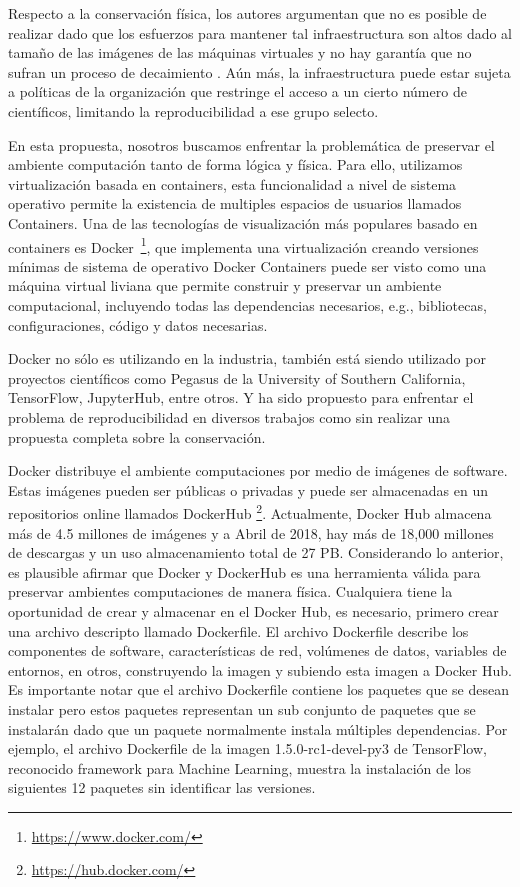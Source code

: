 \documentclass{llncs}
\begin{document}
Respecto a la conservación física, los autores argumentan que no es posible de realizar dado que los esfuerzos para mantener tal infraestructura son altos dado al tamaño de las imágenes de las máquinas virtuales y no hay garantía que no sufran un proceso de decaimiento \cite{gavish2011universal}. Aún más, la infraestructura puede estar sujeta a políticas de la organización que restringe el acceso a un cierto número de científicos, limitando la reproducibilidad a ese grupo selecto.

En esta propuesta, nosotros buscamos enfrentar la problemática de preservar el ambiente computación tanto de forma lógica y física. Para ello, utilizamos virtualización basada en containers, esta funcionalidad a nivel de sistema operativo permite la existencia de multiples espacios de usuarios llamados Containers. Una  de las tecnologías de visualización más populares basado en containers es Docker~\footnote{\url{https://www.docker.com/}}, que implementa una virtualización creando versiones mínimas de sistema de operativo 
Docker Containers puede ser visto como una máquina virtual liviana que permite construir y preservar un ambiente computacional, incluyendo todas las dependencias necesarios, e.g., bibliotecas, configuraciones, código y datos necesarias. 
 
Docker no sólo es utilizando en la industria, también está siendo utilizado por proyectos científicos como Pegasus de la University of Southern California, TensorFlow, JupyterHub, entre otros. Y ha sido propuesto para enfrentar el problema de reproducibilidad en diversos trabajos como \cite{Boettiger:2015:IDR:2723872.2723882,aranguren2015enhanced,di2015impact,cito2016using,hung2016guidock,diaz17adass} sin realizar una propuesta completa sobre la conservación.

Docker distribuye el ambiente computaciones por medio de imágenes de software. Estas imágenes pueden ser públicas o privadas y puede ser almacenadas en un repositorios online llamados DockerHub \footnote{\url{https://hub.docker.com/}}. 
 Actualmente, Docker Hub almacena más de 4.5 millones de imágenes y a Abril de 2018, hay más de 18,000 millones de descargas y un uso almacenamiento total de 27 PB. Considerando lo anterior, es plausible afirmar que Docker y DockerHub es una herramienta válida para preservar ambientes computaciones de manera física. 
Cualquiera tiene la oportunidad de crear y almacenar en el Docker Hub, es necesario, primero crear una archivo descripto llamado Dockerfile.
El archivo Dockerfile describe los componentes de software, características de red, volúmenes de datos, variables de entornos, en otros, construyendo la imagen y subiendo esta imagen a Docker Hub. Es importante notar que el archivo Dockerfile contiene los paquetes que se desean instalar pero estos paquetes representan un sub conjunto de paquetes que se instalarán dado que un paquete normalmente instala múltiples dependencias.
Por ejemplo, el archivo Dockerfile de la imagen 1.5.0-rc1-devel-py3 de TensorFlow, reconocido framework para Machine Learning, muestra la instalación de los siguientes 12 paquetes sin identificar las versiones.
\end{document}
